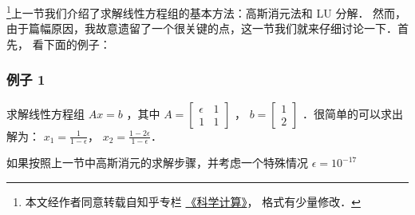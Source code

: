 

\footnote{本文经作者同意转载自知乎专栏 \href{https://www.zhihu.com/column/c_1226443594048942080}{《科学计算》}， 格式有少量修改．}上一节我们介绍了求解线性方程组的基本方法：高斯消元法和 LU 分解． 然而，由于篇幅原因，我故意遗留了一个很关键的点，这一节我们就来仔细讨论一下．首先， 看下面的例子：

\subsubsection{例子 1}

求解线性方程组  $Ax=b$  ，其中  $A=\begin{bmatrix} \epsilon & 1\\ 1 & 1 \end{bmatrix}$  ，  $b=\begin{bmatrix}  1\\  2 \end{bmatrix}$  ．很简单的可以求出解为：  $x_1=\frac{1}{1-\epsilon}$， $x_2=\frac{1-2\epsilon}{1-\epsilon}$．

如果按照上一节中高斯消元的求解步骤，并考虑一个特殊情况  $\epsilon=10^{-17}$  

